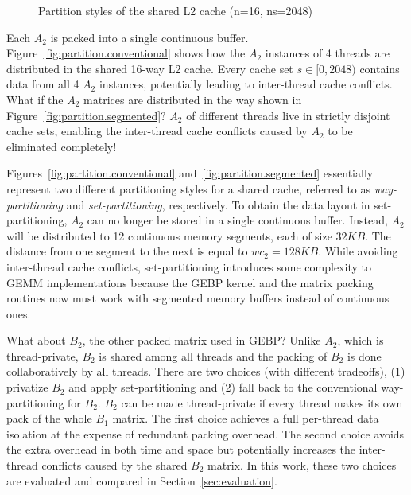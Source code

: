 \begin{figure}
  \centering
  \caption{Partition styles of the shared L2 cache (n=16, ns=2048)}
  \label{fig:partition}
\end{figure}

Each $A_2$ is packed into a single continuous buffer.
Figure~\ref{fig:partition.conventional} shows how the
$A_2$ instances of 4 threads are distributed in the shared 16-way L2 cache.
Every cache set $s \in [0,2048)$ contains
data from all 4 $A_2$ instances,
potentially leading to inter-thread cache conflicts.
What if the $A_2$ matrices are distributed in the way shown in
Figure~\ref{fig:partition.segmented}?
$A_2$ of different threads live in strictly disjoint cache sets, enabling
the inter-thread cache conflicts caused by $A_2$ to be
eliminated completely!

Figures~\ref{fig:partition.conventional} and~\ref{fig:partition.segmented}
essentially represent two different partitioning styles for a shared cache,
referred to as \emph{way-partitioning} and \emph{set-partitioning}, respectively.
To obtain the data layout in set-partitioning,
$A_2$ can no longer be stored in a single continuous buffer.
Instead, $A_2$ will be distributed to 12 continuous memory segments, each of size $32KB$.
The distance from one segment to the next is equal to $wc_2=128KB$.
While avoiding inter-thread cache conflicts,
set-partitioning
introduces some complexity to GEMM implementations
because the GEBP kernel and the matrix packing routines
now must work with segmented memory buffers instead of continuous ones.

What about $B_2$, the other packed matrix used in GEBP?
Unlike $A_2$, which is thread-private,
$B_2$ is shared among all threads and
the packing of $B_2$ is done collaboratively by all threads.
There are two choices (with different tradeoffs), (1) privatize $B_2$ and apply 
set-partitioning and (2) 
fall back to the conventional way-partitioning 
for $B_2$.
$B_2$ can be made thread-private if every thread makes
its own pack of the whole $B_1$ matrix.
The first choice achieves a full per-thread data isolation
at the expense of redundant packing overhead.
The second choice avoids the extra overhead in both time and space
but potentially increases the inter-thread conflicts caused by the shared $B_2$ matrix.
In this work,
these two choices are evaluated and compared in Section~\ref{sec:evaluation}.

